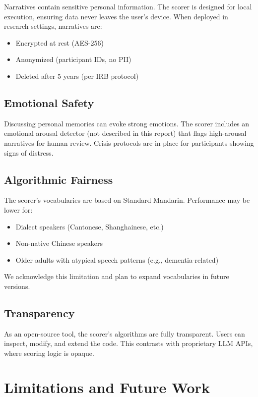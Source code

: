 \documentclass[11pt]{article}
\begin{document}
Narratives contain sensitive personal information. The scorer is designed for local execution, ensuring data never leaves the user's device. When deployed in research settings, narratives are:
\begin{itemize}
    \item Encrypted at rest (AES-256)
    \item Anonymized (participant IDs, no PII)
    \item Deleted after 5 years (per IRB protocol)
\end{itemize}

\subsection{Emotional Safety}

Discussing personal memories can evoke strong emotions. The scorer includes an emotional arousal detector (not described in this report) that flags high-arousal narratives for human review. Crisis protocols are in place for participants showing signs of distress.

\subsection{Algorithmic Fairness}

The scorer's vocabularies are based on Standard Mandarin. Performance may be lower for:
\begin{itemize}
    \item Dialect speakers (Cantonese, Shanghainese, etc.)
    \item Non-native Chinese speakers
    \item Older adults with atypical speech patterns (e.g., dementia-related)
\end{itemize}

We acknowledge this limitation and plan to expand vocabularies in future versions.

\subsection{Transparency}

As an open-source tool, the scorer's algorithms are fully transparent. Users can inspect, modify, and extend the code. This contrasts with proprietary LLM APIs, where scoring logic is opaque.

\section{Limitations and Future Work}
\label{sec:limitations}
\end{document}
